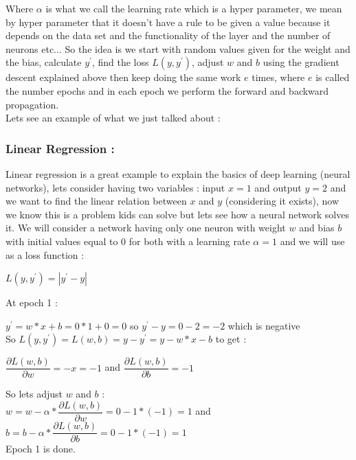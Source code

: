 \documentclass[10pt,a4paper]{article}
\begin{document}
Where $ \alpha $ is what we call the learning rate which is a hyper parameter, we mean by hyper parameter that it doesn't have a rule to be given a value because it depends on the data set and the functionality of the layer and the number of neurons etc... So the idea is we start with random values given for the weight and the bias, calculate $ y^{\prime} $, find the loss $ L(y,y^{\prime}) $, adjust $ w $ and $ b $ using the gradient descent explained above then keep doing the same work $ e $ times, where $ e $ is called the number epochs and in each epoch we perform the forward and backward propagation.\\
Lets see an example of what we just talked about :\\
\subsubsection{Linear Regression :}
Linear regression is a great example to explain the basics of deep learning (neural networks), lets consider having two variables : input $ x = 1 $ and output $ y = 2 $ and we want to find the linear relation between $ x $ and $ y $ (considering it exists), now we know this is a problem kids can solve but lets see how a neural network solves it. We will consider a network having only one neuron with weight $ w $ and bias $ b $ with initial values equal to 0 for both with a learning rate $ \alpha = 1 $ and we will use as a loss function :\\
\begin{center}
$ L(y,y^{\prime}) = |y^{\prime} - y| $\\
\end{center}
At epoch 1 :
\begin{center}
$ y^{\prime} = w*x + b = 0*1 + 0 = 0 $ \hspace{5mm} so \hspace{5mm} $ y^{\prime} - y = 0 - 2 = -2 $ \hspace{5mm} which is negative\\
So \hspace{5mm} $ L(y,y^{\prime}) = L(w,b) = y - y^{\prime} = y - w*x - b $ \hspace{5mm} to get :
\end{center}

\begin{center}
$ \dfrac{\partial L(w,b)}{\partial w} = -x = -1 $ \hspace{5mm} and \hspace{5mm} $ \dfrac{\partial L(w,b)}{\partial b} = -1 $
\end{center}
\begin{center}
So lets adjust $ w $ and $ b $ :\\
$ w = w - \alpha*\dfrac{\partial L(w,b)}{\partial w} = 0 - 1*(-1) = 1 $ \hspace{5mm} and \hspace{5mm} $ b = b - \alpha*\dfrac{\partial L(w,b)}{\partial b} = 0 - 1*(-1) = 1 $\\
Epoch 1 is done.
\end{center}
\end{document}
